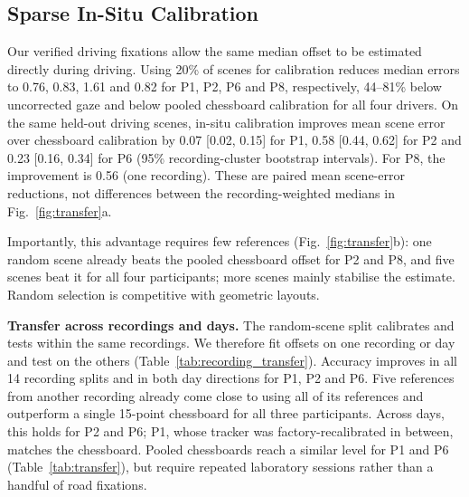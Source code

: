 \subsection{Sparse In-Situ Calibration}
\label{sec:insitu}

Our verified driving fixations allow the same median offset
to be estimated directly during driving.
Using 20\% of scenes for calibration reduces median errors
to 0.76\dg{}, 0.83\dg{}, 1.61\dg{} and 0.82\dg{}
for P1, P2, P6 and P8, respectively, 44--81\%
below uncorrected gaze and below pooled chessboard
calibration for all four drivers.
On the same held-out driving scenes, in-situ calibration
improves mean scene error over chessboard calibration by
0.07\dg{} [0.02, 0.15] for P1, 0.58\dg{} [0.44, 0.62]
for P2 and 0.23\dg{} [0.16, 0.34] for P6
(95\% recording-cluster bootstrap intervals).
For P8, the improvement is 0.56\dg{} (one recording).
These are paired mean scene-error reductions, not differences
between the recording-weighted medians in Fig.~\ref{fig:transfer}a.

Importantly, this advantage requires few references
(Fig.~\ref{fig:transfer}b): one random scene already beats
the pooled chessboard offset for P2 and P8, and five scenes
beat it for all four participants; more scenes mainly
stabilise the estimate. Random selection is competitive with geometric layouts.

\noindent\textbf{Transfer across recordings and days.}
The random-scene split calibrates and tests within the same
recordings. We therefore fit offsets on one recording or day and
test on the others (Table~\ref{tab:recording_transfer}).
Accuracy improves in all 14 recording splits and in both day
directions for P1, P2 and P6. Five references from another
recording already come close to using all of its references and
outperform a single 15-point chessboard for all three
participants. Across days, this holds for P2 and P6; P1, whose
tracker was factory-recalibrated in between, matches the
chessboard. Pooled chessboards reach a similar level for
P1 and P6 (Table~\ref{tab:transfer}), but require repeated
laboratory sessions rather than a handful of road fixations.

\begin{table}[t]
\centering
\caption{Median angular error (\dg{}) when calibration and test
scenes come from different recordings or days, averaged over
source cases. Driving references are drawn from one source
recording or day; all rows share the same test scenes.
P1 day transfer includes factory recalibration.
Bold: lowest error per column.}
\label{tab:recording_transfer}
\footnotesize
\setlength{\tabcolsep}{4pt}

\end{table}

